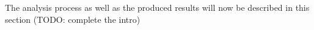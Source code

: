 The analysis process as well as the produced results will now be described in this section (TODO: complete the intro)